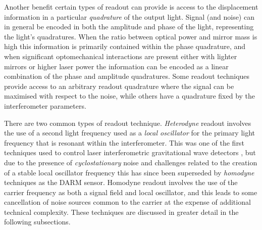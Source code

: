 Another benefit certain types of readout can provide is access to the displacement information in a particular \emph{quadrature} of the output light. Signal (and noise) can in general be encoded in both the amplitude and phase of the light, representing the light's quadratures. When the ratio between optical power and mirror mass is high this information is primarily contained within the phase quadrature, and when significant optomechanical interactions are present either with lighter mirrors or higher laser power the information can be encoded as a linear combination of the phase and amplitude quadratures. Some readout techniques provide access to an arbitrary readout quadrature where the signal can be maximised with respect to the noise, while others have a quadrature fixed by the interferometer parameters.

There are two common types of readout technique. \emph{Heterodyne} readout involves the use of a second light frequency used as a \emph{local oscillator} for the primary light frequency that is resonant within the interferometer. This was one of the first techniques used to control laser interferometric gravitational wave detectors \cite{Willke2002}, but due to the presence of \emph{cyclostationary} noise \cite{Niebauer1991} and challenges related to the creation of a stable local oscillator frequency this has since been superseded by \emph{homodyne} techniques as the \gls{DARM} sensor. Homodyne readout involves the use of the carrier frequency as both a signal field and local oscillator, and this leads to some cancellation of noise sources common to the carrier at the expense of additional technical complexity. These techniques are discussed in greater detail in the following subsections.

